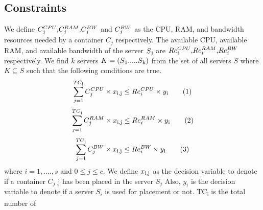 \documentclass[conference]{IEEEtran}
\newcommand\numberthis{\addtocounter{equation}{1}\tag{\theequation}}
\begin{document}
\subsection{Constraints}
We define \begin{math} $$C_{j}^{CPU}$$ , $$C_{j}^{RAM}$$ ,  $$C_{j}^{BW}$$\end{math} and \begin{math}  $$C_{j}^{BW}$$\end{math} as the CPU, RAM, and bandwidth resources needed by a container \begin{math} C_j \end{math}
respectively. The available CPU, available RAM, and available bandwidth
of the server \begin{math} S\textsubscript{j}\end{math} are \begin{math}$$Re_{i}^{CPU}$$ , $$Re_{i}^{RAM}$$ ,  $$Re_{i}^{BW}$$ \end{math} respectively. We find \begin{math} k\end{math} servers \begin{math} K = (S\textsubscript{1}.....S\textsubscript{k})\end{math}  from the set of all servers \begin{math} S\end{math} where \begin{math} K \subseteq S\end{math} such that the following conditions are true. 
\begin{align*} \sum_{j=1}^{TC\textsubscript{i}} C_{j}^{CPU} \times x \textsubscript{i,j} \leq Re_{i}^{CPU} \times y\textsubscript{i} \numberthis \label{eqn} \end{align*}
\begin{align*} \sum_{j=1}^{TC\textsubscript{i}} C_{j}^{RAM} \times x \textsubscript{i,j} \leq Re_{i}^{RAM} \times y\textsubscript{i}\numberthis \label{eqn} \end{align*}
\begin{align*} \sum_{j=1}^{TC\textsubscript{i}} C_{j}^{BW} \times x \textsubscript{i,j} \leq Re_{i}^{BW} \times y\textsubscript{i} \numberthis \label{eqn} \end{align*}
where \begin{math} i = 1,....,s\end{math} and \begin{math} 0 \leq j \leq c\end{math}. We define \begin{math} x\textsubscript{i,j}\end{math} as the decision variable to denote if a container \begin{math} C_{j}\end{math} j has been placed in the server \begin{math} S_{j}\end{math}  Also, \begin{math} y_{i}\end{math} is the decision variable to denote if a server \begin{math} S_{i}\end{math} is used for placement or not. TC\textsubscript{i} is the total number of
\end{document}
